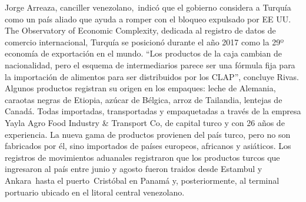 \documentclass{article}%
\begin{document}
\newline%
%
Jorge Arreaza, canciller venezolano,~indicó que el gobierno considera a Turquía como un país aliado que ayuda a romper con el bloqueo expulsado por EE UU.%
\newline%
%
The Observatory of Economic Complexity, dedicada al registro de datos de comercio internacional, Turquía se posicionó durante el año 2017 como la 29º economía de exportación en el mundo.%
\newline%
%
“Los productos de la caja cambian de nacionalidad, pero el esquema de intermediarios parece ser una fórmula fija para la importación de alimentos para ser distribuidos por los CLAP”, concluye Rivas.%
\newline%
%
Algunos productos registran su origen en los empaques: leche de Alemania, caraotas negras de Etiopia, azúcar de Bélgica, arroz de Tailandia, lentejas de Canadá. Todas importadas, transportadas y empaquetadas a través de la empresa Yayla Agro Food Industry \& Transport Co, de capital turco y con 26 años de experiencia.%
\newline%
%
La nueva gama de productos provienen del país turco, pero no son fabricados por él, sino importados de países europeos, africanos y asiáticos.%
\newline%
%
Los registros de movimientos aduanales registraron que los productos turcos que ingresaron al país entre junio y agosto fueron traidos desde Estambul y Ankara~hasta el puerto~Cristóbal en Panamá y, posteriormente, al terminal portuario ubicado en el litoral central venezolano.%
\newline%
%
\end{document}

